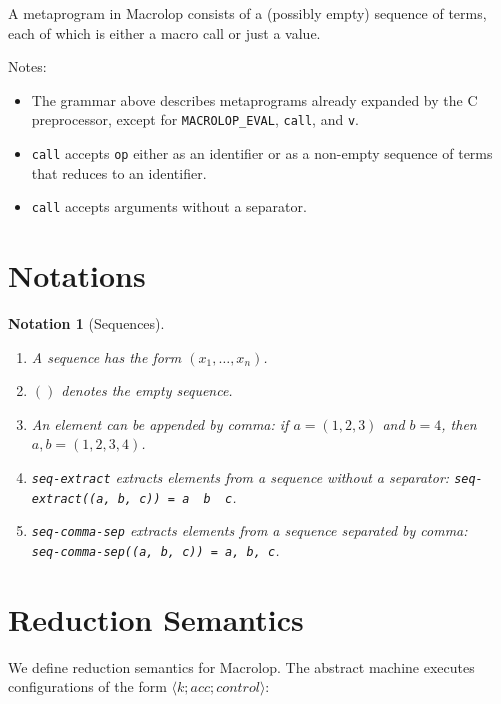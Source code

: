 \documentclass[a4paper, 12pt]{article}
\theoremstyle{break}
\newtheorem{notation}{Notation}
\begin{document}
A metaprogram in Macrolop consists of a (possibly empty) sequence of terms, each of which
is either a macro call or just a value.

Notes:

\begin{itemize}
    \item The grammar above describes metaprograms already expanded by the C preprocessor,
    except for \texttt{MACROLOP\_EVAL}, \texttt{call}, and \texttt{v}.
    \item \texttt{call} accepts \texttt{op} either as an identifier or as a non-empty
    sequence of terms that reduces to an identifier.
    \item \texttt{call} accepts arguments without a separator.
\end{itemize}

\section{Notations}

\begin{notation}[Sequences]
    \begin{enumerate}
        \item A sequence has the form $(x_1, \ldots, x_n)$.
        \item $()$ denotes the empty sequence.
        \item An element can be appended by comma: if $a = (1, 2, 3)$ and $b = 4$, then $a, b = (1, 2, 3, 4)$.
        \item \texttt{seq-extract} extracts elements from a sequence without a separator:
        \texttt{seq-extract((a, b, c)) = a \ b \ c}.
        \item \texttt{seq-comma-sep} extracts elements from a sequence separated by comma: \\
        \texttt{seq-comma-sep((a, b, c)) = a, b, c}.
    \end{enumerate}
\end{notation}

\section{Reduction Semantics}
\label{ReductionSemantics}

We define reduction semantics for Macrolop. The abstract machine executes configurations
of the form $\langle k; acc; control \rangle$:
\end{document}
